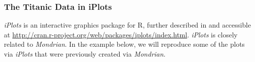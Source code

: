 \documentclass[12pt,letterpaper,final]{article}
\begin{document}







\newpage


\subsubsection{The Titanic Data in iPlots}

{\it iPlots} is an interactive graphics package for R,
further described in \cite{TU2004} and
accessible at
\url{http://cran.r-project.org/web/packages/iplots/index.html}.
{\it iPlots} is closely related to {\it Mondrian}.
In the example below, we will reproduce some of the plots
via {\it iPlots} that were previously created via {\it Mondrian}.
\end{document}
